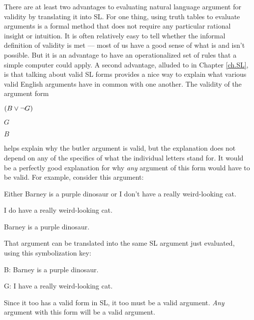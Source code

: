 There are at least two advantages to evaluating natural language argument for validity by translating it into SL. For one thing, using truth tables to evaluate arguments is a formal method that does not require any particular rational insight or intuition. It is often relatively easy to tell whether the informal definition of validity is met --- most of us have a good sense of what is and isn't possible. But it is an advantage to have an operationalized set of rules that a simple computer could apply. A second advantage, alluded to in Chapter \ref{ch.SL}, is that talking about valid SL forms provides a nice way to explain what various valid English arguments have in common with one another. The validity of the argument form

\begin{earg}
\item $(B\vee\neg G)$
\item $G$
\item[\therefore] $B$
\end{earg}

helps explain why the butler argument is valid, but the explanation does not depend on any of the specifics of what the individual letters stand for. It would be a perfectly good explanation for why \emph{any} argument of this form would have to be valid. For example, consider this argument:

\begin{earg}
\item Either Barney is a purple dinosaur or I don't have a really weird-looking cat.
\item I do have a really weird-looking cat.
\item[\therefore] Barney is a purple dinosaur.
\end{earg}

That argument can be translated into the same SL argument just evaluated, using this symbolization key:

\begin{ekey}
\item[B:] Barney is a purple dinosaur.
\item[G:] I have a really weird-looking cat.
\end{ekey}

Since it too has a valid form in SL, it too must be a valid argument. \emph{Any} argument with this form will be a valid argument.


